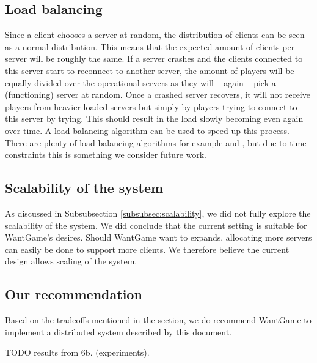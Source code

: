 	\subsection{Load balancing}
	\label{subsec:load_balancing}
		Since a client chooses a server at random, the distribution of clients can be seen as a normal distribution. 
		This means that the expected amount of clients per server will be roughly the same.
		If a server crashes and the clients connected to this server start to reconnect to another server, the amount of players will be equally divided over the operational servers as they will -- again -- pick a (functioning) server at random.
		Once a crashed server recovers, it will not receive players from heavier loaded servers but simply by players trying to connect to this server by trying. 
		This should result in the load slowly becoming even again over time. 
		A load balancing algorithm can be used to speed up this process.
		There are plenty of load balancing algorithms for example \cite{wolff2001dynamic} and \cite{ballard2000client}, but due to time constraints this is something we consider future work.
		
	\subsection{Scalability of the system}
	\label{subsec:scalability_system_discussion}
		As discussed in Subsubsection \ref{subsubsec:scalability}, we did not fully explore the scalability of the system. We did conclude that the current setting is suitable for WantGame's desires. Should WantGame want to expands, allocating more servers can easily be done to support more clients. We therefore believe the current design allows scaling of the system.
		
	\subsection{Our recommendation}
	\label{subsec:our_recommendation}
		Based on the tradeoffs mentioned in the section, we do recommend WantGame to implement a distributed system described by this document. 
	
	TODO results from 6b. (experiments).